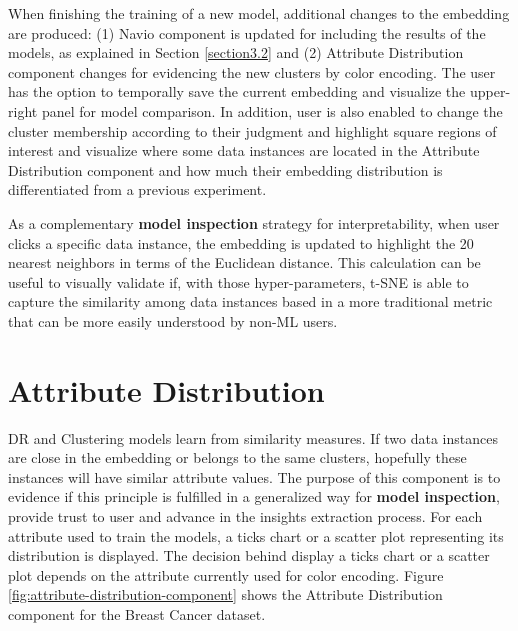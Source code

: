 When finishing the training of a new model, additional changes to the embedding are produced: (1) Navio component is updated for including the results of the models, as explained in Section \ref{section3.2} and (2) Attribute Distribution component changes for evidencing the new clusters by color encoding. The user has the option to temporally save the current embedding and visualize the upper-right panel for model comparison. In addition, user is also enabled to change the cluster membership according to their judgment and highlight square regions of interest and visualize where some data instances are located in the Attribute Distribution component and how much their embedding distribution is differentiated from a previous experiment.

As a complementary \textbf{model inspection} strategy for interpretability, when user clicks a specific data instance, the embedding is updated to highlight the 20 nearest neighbors in terms of the Euclidean distance. This calculation can be useful to visually validate if, with those hyper-parameters, t-SNE is able to capture the similarity among data instances based in a more traditional metric that can be more easily understood by non-ML users. 

\section{Attribute Distribution}
\label{section3.5}

DR and Clustering models learn from similarity measures. If two data instances are close in the embedding or belongs to the same clusters, hopefully these instances will have similar attribute values. The purpose of this component is to evidence if this principle is fulfilled in a generalized way for \textbf{model inspection}, provide trust to user and advance in the insights extraction process. For each attribute used to train the models, a ticks chart or a scatter plot representing its distribution is displayed. The decision behind display a ticks chart or a scatter plot depends on the attribute currently used for color encoding. Figure \ref{fig:attribute-distribution-component} shows the Attribute Distribution component for the Breast Cancer dataset.

